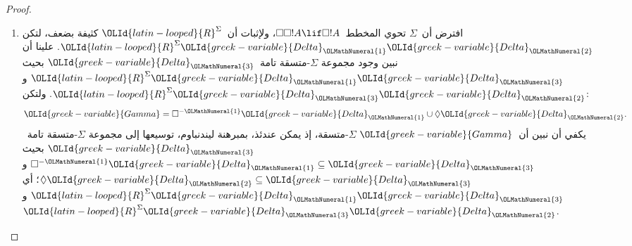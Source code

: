 \documentclass[../../../include/open-logic-section]{subfiles}
\begin{document}
\begin{proof}
\begin{enumerate}
  \item افترض أن~$\Sigma$ تحوي المخطط~$\Box\Box!A \lif \Box!A$،
    ولإثبات أن~$\OLId{latin-looped}{R}^\Sigma$ كثيفة بضعف، لتكن
    $\OLId{latin-looped}{R}^\Sigma \OLId{greek-variable}{Delta}_\OLMathNumeral{1}\OLId{greek-variable}{Delta}_\OLMathNumeral{2}$. علينا أن نبين وجود مجموعة
    $\Sigma$-متسقة تامة~$\OLId{greek-variable}{Delta}_\OLMathNumeral{3}$ بحيث
    $\OLId{latin-looped}{R}^\Sigma \OLId{greek-variable}{Delta}_\OLMathNumeral{1}\OLId{greek-variable}{Delta}_\OLMathNumeral{3}$ و$\OLId{latin-looped}{R}^\Sigma \OLId{greek-variable}{Delta}_\OLMathNumeral{3}\OLId{greek-variable}{Delta}_\OLMathNumeral{2}$. ولتكن:
    \[
    \OLId{greek-variable}{Gamma} = \Box^{-\OLMathNumeral{1}}\OLId{greek-variable}{Delta}_\OLMathNumeral{1} \cup \Diamond\OLId{greek-variable}{Delta}_\OLMathNumeral{2}.
    \]
    يكفي أن نبين أن~$\OLId{greek-variable}{Gamma}$ $\Sigma$-متسقة، إذ يمكن عندئذ، بمبرهنة
    ليندنباوم، توسيعها إلى مجموعة $\Sigma$-متسقة تامة~$\OLId{greek-variable}{Delta}_\OLMathNumeral{3}$ بحيث
    $\Box^{-\OLMathNumeral{1}}\OLId{greek-variable}{Delta}_\OLMathNumeral{1} \subseteq \OLId{greek-variable}{Delta}_\OLMathNumeral{3}$ و
    $\Diamond\OLId{greek-variable}{Delta}_\OLMathNumeral{2} \subseteq \OLId{greek-variable}{Delta}_\OLMathNumeral{3}$؛ أي
    $\OLId{latin-looped}{R}^\Sigma \OLId{greek-variable}{Delta}_\OLMathNumeral{1}\OLId{greek-variable}{Delta}_\OLMathNumeral{3}$ و
    $\OLId{latin-looped}{R}^\Sigma \OLId{greek-variable}{Delta}_\OLMathNumeral{3}\OLId{greek-variable}{Delta}_\OLMathNumeral{2}$.


\end{enumerate}
\end{proof}
\end{document}
